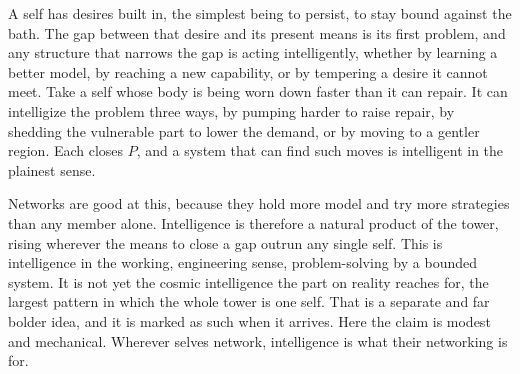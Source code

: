 A self has desires built in, the simplest being to persist, to stay bound against the bath. The gap between that desire and its present means is its first problem, and any structure that narrows the gap is acting intelligently, whether by learning a better model, by reaching a new capability, or by tempering a desire it cannot meet. Take a self whose body is being worn down faster than it can repair. It can intelligize the problem three ways, by pumping harder to raise repair, by shedding the vulnerable part to lower the demand, or by moving to a gentler region. Each closes $P$, and a system that can find such moves is intelligent in the plainest sense.

Networks are good at this, because they hold more model and try more strategies than any member alone. Intelligence is therefore a natural product of the tower, rising wherever the means to close a gap outrun any single self. This is intelligence in the working, engineering sense, problem-solving by a bounded system. It is not yet the cosmic intelligence the part on reality reaches for, the largest pattern in which the whole tower is one self. That is a separate and far bolder idea, and it is marked as such when it arrives. Here the claim is modest and mechanical. Wherever selves network, intelligence is what their networking is for.
